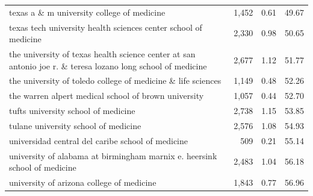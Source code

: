 \begin{table}[!h]
\begin{tabular}{llll}
\multicolumn{1}{l}{\hspace{1em}texas a \& m university college of medicine} &
  \multicolumn{1}{r}{1,452} &
  \multicolumn{1}{r}{0.61} &
  \multicolumn{1}{r}{49.67} \\
\multicolumn{1}{l}{\hspace{1em}texas tech university health sciences center school of medicine} &
  \multicolumn{1}{r}{2,330} &
  \multicolumn{1}{r}{0.98} &
  \multicolumn{1}{r}{50.65} \\
\multicolumn{1}{l}{\hspace{1em}the university of texas health science center at san antonio joe r. \& teresa lozano long school of medicine} &
  \multicolumn{1}{r}{2,677} &
  \multicolumn{1}{r}{1.12} &
  \multicolumn{1}{r}{51.77} \\
\multicolumn{1}{l}{\hspace{1em}the university of toledo college of medicine \& life sciences} &
  \multicolumn{1}{r}{1,149} &
  \multicolumn{1}{r}{0.48} &
  \multicolumn{1}{r}{52.26} \\
\multicolumn{1}{l}{\hspace{1em}the warren alpert medical school of brown university} &
  \multicolumn{1}{r}{1,057} &
  \multicolumn{1}{r}{0.44} &
  \multicolumn{1}{r}{52.70} \\
\multicolumn{1}{l}{\hspace{1em}tufts university school of medicine} &
  \multicolumn{1}{r}{2,738} &
  \multicolumn{1}{r}{1.15} &
  \multicolumn{1}{r}{53.85} \\
\multicolumn{1}{l}{\hspace{1em}tulane university school of medicine} &
  \multicolumn{1}{r}{2,576} &
  \multicolumn{1}{r}{1.08} &
  \multicolumn{1}{r}{54.93} \\
\multicolumn{1}{l}{\hspace{1em}universidad central del caribe school of medicine} &
  \multicolumn{1}{r}{509} &
  \multicolumn{1}{r}{0.21} &
  \multicolumn{1}{r}{55.14} \\
\multicolumn{1}{l}{\hspace{1em}university of alabama at birmingham marnix e. heersink school of medicine} &
  \multicolumn{1}{r}{2,483} &
  \multicolumn{1}{r}{1.04} &
  \multicolumn{1}{r}{56.18} \\
\multicolumn{1}{l}{\hspace{1em}university of arizona college of medicine} &
  \multicolumn{1}{r}{1,843} &
  \multicolumn{1}{r}{0.77} &
  \multicolumn{1}{r}{56.96} \\

\end{tabular}
\end{table}
